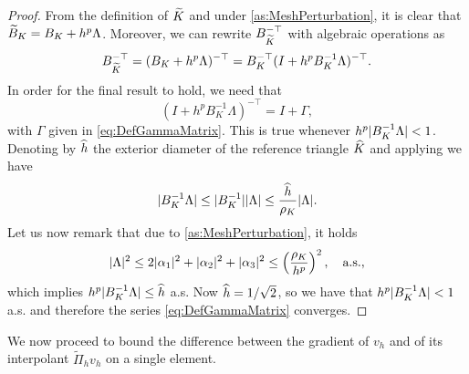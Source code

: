 \documentclass[10pt]{article}
\begin{document}
\begin{proof} From the definition of $\widetilde K$ and under \cref{as:MeshPerturbation}, it is clear that $\widetilde B_K = B_K + h^p\Lambda$. Moreover, we can rewrite $B_{\widetilde K}^{-\top}$ with algebraic operations as
\begin{equation}
	B_{\widetilde K}^{-\top} = (B_K + h^p \Lambda)^{-\top} = B_K^{-\top}(I + h^p B_K^{-1}\Lambda)^{-\top}.
\end{equation}
In order for the final result to hold, we need that
\begin{equation}\label{eq:DefGammaMatrix_2}
	(I + h^p B_K^{-1}\Lambda)^{-\top} = I + \Gamma,
\end{equation}
with $\Gamma$ given in \eqref{eq:DefGammaMatrix}. This is true whenever $h^p \lvert B_K^{-1} \Lambda\rvert < 1$. Denoting by $\widehat h$ the exterior diameter of the reference triangle $\widehat K$ and applying \cite[Theorem 3.1.3]{Cia02} we have
\begin{equation}
	\lvert B_K^{-1} \Lambda\rvert \leq \lvert B_K^{-1}\rvert\lvert\Lambda\rvert \leq \frac{\widehat h}{\rho_K} \lvert\Lambda\rvert.
\end{equation}
Let us now remark that due to \cref{as:MeshPerturbation}, it holds
\begin{equation}
	\lvert\Lambda\rvert^2 \leq 2 \lvert\alpha_1\rvert^2 + \lvert\alpha_2\rvert^2 + \lvert\alpha_3\rvert^2 \leq \left(\frac{\rho_K}{h^p}\right)^2, \quad \text{a.s.},
\end{equation}
which implies $h^p\lvert B_K^{-1} \Lambda\rvert \leq \widehat h$ a.s. Now $\widehat h = 1 / \sqrt{2}$, so we have that $h^p\lvert B_K^{-1}\Lambda\rvert < 1$ a.s. and therefore the series \eqref{eq:DefGammaMatrix} converges.
\end{proof}

We now proceed to bound the difference between the gradient of $v_h$ and of its interpolant $\widetilde \Pi_h v_h$ on a single element. 
\end{document}
